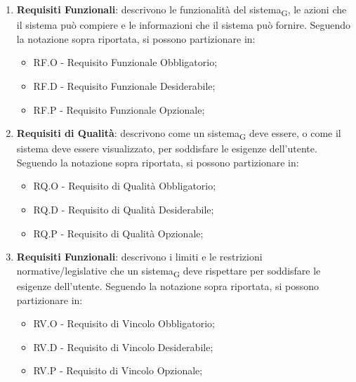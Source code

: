 \begin{enumerate}
    \item \textbf{Requisiti Funzionali}: descrivono le funzionalità del sistema\textsubscript{G}, le azioni che il sistema può compiere e le informazioni che il sistema può fornire. Seguendo la notazione sopra riportata, si possono partizionare in:
    \begin{itemize}
        \item RF.O - Requisito Funzionale Obbligatorio;
        \item RF.D - Requisito Funzionale Desiderabile;
        \item RF.P - Requisito Funzionale Opzionale;
    \end{itemize}
     \item \textbf{Requisiti di Qualità}: descrivono come un sistema\textsubscript{G} deve essere, o come il sistema deve essere visualizzato, per soddisfare le esigenze dell’utente. Seguendo la notazione sopra riportata, si possono partizionare in:
    \begin{itemize}
        \item RQ.O - Requisito di Qualità Obbligatorio;
        \item RQ.D - Requisito di Qualità Desiderabile;
        \item RQ.P - Requisito di Qualità Opzionale;
    \end{itemize}
     \item \textbf{Requisiti Funzionali}: descrivono i limiti e le restrizioni normative/legislative che un
    sistema\textsubscript{G} deve rispettare per soddisfare le esigenze dell’utente. Seguendo la notazione sopra riportata, si possono partizionare in:
    \begin{itemize}
        \item RV.O - Requisito di Vincolo Obbligatorio;
        \item RV.D - Requisito di Vincolo Desiderabile;
        \item RV.P - Requisito di Vincolo Opzionale;
    \end{itemize}
\end{enumerate}